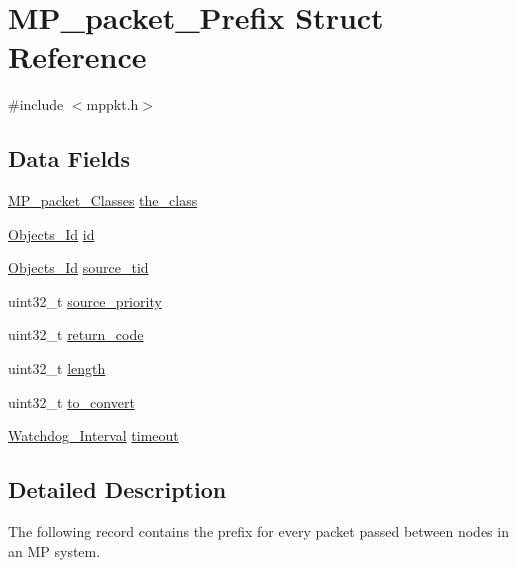 \hypertarget{structMP__packet__Prefix}{}\section{M\+P\+\_\+packet\+\_\+\+Prefix Struct Reference}
\label{structMP__packet__Prefix}


{\ttfamily \#include $<$mppkt.\+h$>$}

\subsection*{Data Fields}
\begin{DoxyCompactItemize}
\item 
\mbox{\hyperlink{group__RTEMSScoreMPPacket_gafed9717210f8917e5acb8e63f2c6bac3}{M\+P\+\_\+packet\+\_\+\+Classes}} \mbox{\hyperlink{structMP__packet__Prefix_aa63f1be2ef161f20c0913de59200f048}{the\+\_\+class}}
\item 
\mbox{\hyperlink{group__RTEMSScoreObject_ga5821f52a51072941bdd603e542d0863e}{Objects\+\_\+\+Id}} \mbox{\hyperlink{structMP__packet__Prefix_aa5ad51ac9ad8ceb21a10d692f0330f74}{id}}
\item 
\mbox{\hyperlink{group__RTEMSScoreObject_ga5821f52a51072941bdd603e542d0863e}{Objects\+\_\+\+Id}} \mbox{\hyperlink{structMP__packet__Prefix_a2758e97db714485e542c8796c360ca14}{source\+\_\+tid}}
\item 
uint32\+\_\+t \mbox{\hyperlink{structMP__packet__Prefix_a72d7f5806281fcd6b3e0159f43d8150b}{source\+\_\+priority}}
\item 
uint32\+\_\+t \mbox{\hyperlink{structMP__packet__Prefix_af56a9f18ae9ecbb27f193150671d4fdc}{return\+\_\+code}}
\item 
uint32\+\_\+t \mbox{\hyperlink{structMP__packet__Prefix_aef4dcc3230663748d0982513eb11b15a}{length}}
\item 
uint32\+\_\+t \mbox{\hyperlink{structMP__packet__Prefix_ab29ed1964f9a59cae1760e68640e152a}{to\+\_\+convert}}
\item 
\mbox{\hyperlink{group__RTEMSScoreWatchdog_gaa1834fd7531ca9bb5c4ca6fd990388d5}{Watchdog\+\_\+\+Interval}} \mbox{\hyperlink{structMP__packet__Prefix_abbc308af42b7b3619fb3e72e4c9b2264}{timeout}}
\end{DoxyCompactItemize}


\subsection{Detailed Description}
The following record contains the prefix for every packet passed between nodes in an MP system.

